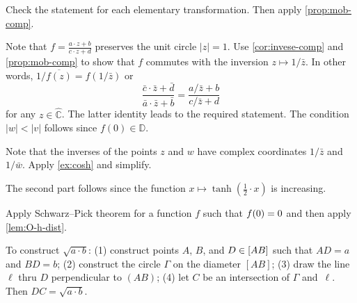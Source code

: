 \begin{multicols}{2}
 
Check the statement for each elementary transformation.
Then apply \ref{prop:mob-comp}.

Note that $f=\tfrac{a\cdot z+b}{c\cdot z+d}$ preserves the unit circle $|z|=1$.
Use \ref{cor:invese-comp} and \ref{prop:mob-comp} to show that $f$ commutes with the inversion $z\mapsto 1/\bar z$.
In other words, $1/\overline{f(z)}=f(1/\bar z)$ or
\[\frac{\bar c\cdot \bar z+\bar d}{\bar a\cdot \bar z+\bar b}
=\frac{a/\bar z+b}{c/\bar z+d}\]
for any $z\in\hat{\mathbb{C}}$.
The latter identity leads to the required statement. 
The condition $|w|<|v|$ follows since $f(0)\in\mathbb{D}$.

Note that the inverses of the points $z$ and $w$ have complex coordinates $1/\bar z$ and $1/\bar w$.
Apply \ref{ex:cosh} and simplify.

The second part follows since the function $x\mapsto \tanh(\tfrac12\cdot x)$ is increasing.

Apply Schwarz--Pick theorem for a function $f$ such that $f(0)\z=0$ and then apply \ref{lem:O-h-dist}.

\setcounter{eqtn}{0}

%
%
%
%

To construct  $\sqrt{a\cdot b}$:
(1) construct points $A$, $B$, and $D\z\in [AB]$
such that $AD=a$ and $BD=b$;
(2) construct the circle $\Gamma$ on the diameter $[AB]$;
(3) draw the line $\ell$ thru $D$ perpendicular to $(AB)$; 
(4) let $C$ be an intersection of $\Gamma$ and~$\ell$.
Then $DC= \sqrt{a\cdot b}$.

{

}
\end{multicols}

